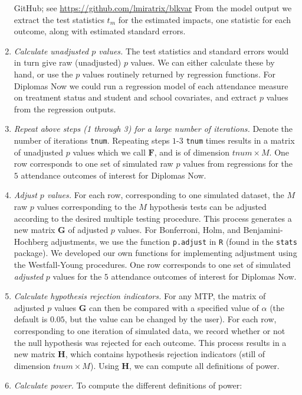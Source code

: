 \documentclass[
]{jss}
\begin{document}
\begin{enumerate}
{    GitHub; see \url{https://github.com/lmiratrix/blkvar}} From the
  model output we extract the test statistics \(t_m\) for the estimated
  impacts, one statistic for each outcome, along with estimated standard
  errors.
\item
  \emph{Calculate unadjusted \(p\) values.} The test statistics and
  standard errors would in turn give raw (unadjusted) \(p\) values. We
  can either calculate these by hand, or use the \(p\) values routinely
  returned by regression functions. For Diplomas Now we could run a
  regression model of each attendance measure on treatment status and
  student and school covariates, and extract \(p\) values from the
  regression outputs.
\item
  \emph{Repeat above steps (1 through 3) for a large number of
  iterations.} Denote the number of iterations \texttt{tnum}. Repeating
  steps \(1\)-\(3\) \texttt{tnum} times results in a matrix of
  unadjusted \(p\) values which we call \(\mathbf{F}\), and is of
  dimension \(tnum \times M\). One row corresponds to one set of
  simulated raw \(p\) values from regressions for the \(5\) attendance
  outcomes of interest for Diplomas Now.
\item
  \emph{Adjust \(p\) values.} For each row, corresponding to one
  simulated dataset, the \(M\) raw \(p\) values corresponding to the
  \(M\) hypothesis tests can be adjusted according to the desired
  multiple testing procedure. This process generates a new matrix
  \(\mathbf{G}\) of adjusted \(p\) values. For Bonferroni, Holm, and
  Benjamini-Hochberg adjustments, we use the function \texttt{p.adjust}
  in \texttt{R} (found in the \texttt{stats} package). We developed our
  own functions for implementing adjustment using the Westfall-Young
  procedures. One row corresponds to one set of simulated
  \emph{adjusted} \(p\) values for the \(5\) attendance outcomes of
  interest for Diplomas Now.
\item
  \emph{Calculate hypothesis rejection indicators.} For any MTP, the
  matrix of adjusted \(p\) values \(\mathbf{G}\) can then be compared
  with a specified value of \(\alpha\) (the default is \(0.05\), but the
  value can be changed by the user). For each row, corresponding to one
  iteration of simulated data, we record whether or not the null
  hypothesis was rejected for each outcome. This process results in a
  new matrix \(\mathbf{H}\), which contains hypothesis rejection
  indicators (still of dimension \(tnum \times M\)). Using
  \(\mathbf{H}\), we can compute all definitions of power.
\item
  \emph{Calculate power.} To compute the different definitions of power:
\end{enumerate}
\end{document}
